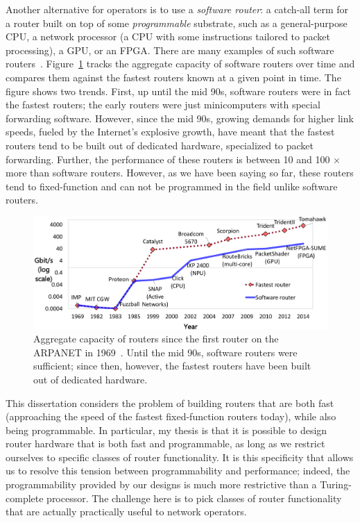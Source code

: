 Another alternative for operators is to use a \textit{software router}: a
catch-all term for a router built on top of some \textit{programmable}
substrate, such as a general-purpose CPU, a network processor (a CPU with some
instructions tailored to packet processing), a GPU, or an FPGA. There are many
examples of such software routers~\cite{click, routebrucks, netfpga,
packetshader, ixp}. Figure~\ref{fig:router_evolution} tracks the aggregate
capacity of software routers over time and compares them against the fastest
routers known at a given point in time. The figure shows two trends. First, up
until the mid 90s, software routers were in fact the fastest routers; the early
routers were just minicomputers with special forwarding software. However,
since the mid 90s, growing demands for higher link speeds, fueled by the
Internet's explosive growth, have meant that the fastest routers tend to be
built out of dedicated hardware, specialized to packet forwarding. Further, the
performance of these routers is between 10 and 100 $\times$ more than software
routers. However, as we have been saying so far, these routers tend to
fixed-function and can not be programmed in the field unlike software routers.

\begin{figure}
\centering
\includegraphics[width=\columnwidth]{router_evolution.pdf}
\caption{Aggregate capacity of routers since the first router on the ARPANET in
1969~\cite{imp}. Until the mid 90s, software routers were sufficient; since
then, however, the fastest routers have been built out of dedicated hardware.}
\label{fig:router_evolution}
\end{figure}

This dissertation considers the problem of building routers that are both fast
(\ie approaching the speed of the fastest fixed-function routers today), while
also being programmable. In particular, my thesis is that it is possible to
design router hardware that is both fast and programmable, as long as we
restrict ourselves to specific classes of router functionality. It is this
specificity that allows us to resolve this tension between programmability and
performance; indeed, the programmability provided by our designs is much more
restrictive than a Turing-complete processor. The challenge here is to pick
classes of router functionality that are actually practically useful to network
operators.

